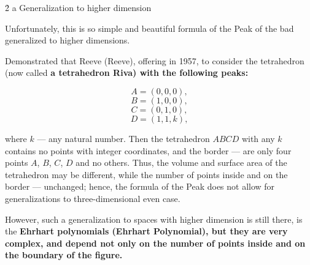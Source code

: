 \h2{ a Generalization to higher dimension }

Unfortunately, this is so simple and beautiful formula of the Peak of the bad generalized to higher dimensions.

Demonstrated that Reeve (Reeve), offering in 1957, to consider the tetrahedron (now called \bf{a tetrahedron Riva}) with the following peaks:

$$ A = (0,0,0), $$
$$ B = (1,0,0), $$
$$ C = (0,1,0), $$
$$ D = (1,1,k), $$

where $k$ --- any natural number. Then the tetrahedron $ABCD$ with any $k$ contains no points with integer coordinates, and the border --- are only four points $A$, $B$, $C$, $D$ and no others. Thus, the volume and surface area of the tetrahedron may be different, while the number of points inside and on the border --- unchanged; hence, the formula of the Peak does not allow for generalizations to three-dimensional even case.

However, such a generalization to spaces with higher dimension is still there, is the \bf{Ehrhart polynomials} (Ehrhart Polynomial), but they are very complex, and depend not only on the number of points inside and on the boundary of the figure.


